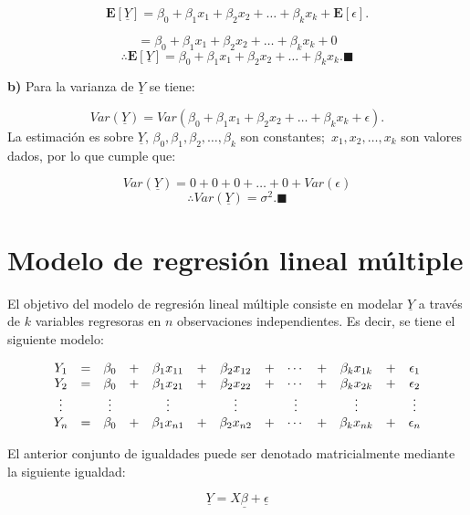 \documentclass[
  a4paper,
  oneside,
  openany]{book}
\begin{document}
\[\mathbf{E}[\underline{Y}]=\beta_{0}+\beta_{1}x_{1}+\beta_{2}x_{2}+ \ldots +\beta_{k}x_{k}+\mathbf{E}[\epsilon].\]

\[=\beta_{0}+\beta_{1}x_{1}+\beta_{2}x_{2}+ \ldots +\beta_{k}x_{k}+0\]
\[\therefore \mathbf{E}[\underline{Y}]= \beta_{0}+\beta_{1}x_{1}+\beta_{2}x_{2}+ \ldots + \beta_{k}x_{k}. \blacksquare\]

\textbf{b)} Para la varianza de \(\underline{Y}\) se tiene:

\[Var(\underline{Y})=Var\left( \beta_{0}+\beta_{1}x_{1}+\beta_{2}x_{2}+ \ldots + \beta_{k}x_{k}+ \epsilon\right).\]
La estimación es sobre \(\underline{Y}\), \(\beta_{0},\beta_{1},\beta_{2},\ldots,\beta_{k}\) son constantes;~\(x_{1},x_{2},\ldots,x_{k}\) son valores dados, por lo que cumple que:

\[Var(\underline{Y})=0+0+0+\ldots+0+Var(\epsilon)\]
\[\therefore Var(\underline{Y})=\sigma^2.\blacksquare\]

\hypertarget{modelo-de-regresiuxf3n-lineal-muxfaltiple-1}{%
\section{Modelo de regresión lineal múltiple}\label{modelo-de-regresiuxf3n-lineal-muxfaltiple-1}}

El objetivo del modelo de regresión lineal múltiple consiste en modelar \(\underline{Y}\) a través de \(k\) variables regresoras en \(n\) observaciones independientes. Es decir, se tiene el siguiente modelo:

\[
\begin{array}{ c c c c c c c c c c c c c }
Y_{1}  & = & \beta_{0} & + & \beta_{1}x_{11}& +& \beta_{2}x_{12} & +& \cdots & + & \beta_{k}x_{1k} & + & \epsilon_{1}  \\ 
Y_{2}  & = & \beta_{0} & + & \beta_{1}x_{21}& +& \beta_{2}x_{22} & +& \cdots & + & \beta_{k}x_{2k} & + & \epsilon_{2}  \\
\vdots  &  & \vdots &  & \vdots& & \vdots & & \vdots & & \vdots &  & \vdots  \\
Y_{n}  & = & \beta_{0} & + & \beta_{1}x_{n1}& +& \beta_{2}x_{n2} & +& \cdots & + & \beta_{k}x_{nk} & + & \epsilon_{n}  \\ 
\end{array}
\]

El anterior conjunto de igualdades puede ser denotado matricialmente mediante la siguiente igualdad:

\[\underline{Y}=X\underline{\beta}+\underline{\epsilon}\]
\end{document}
